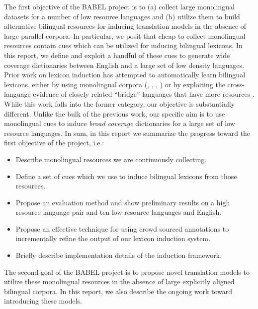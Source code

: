 \documentclass{article}
\begin{document}
The first objective of the BABEL project is to (a) collect large monolingual datasets for a number of low resource languages and (b) utilize them to build alternative bilingual resources for inducing translation models in the absence of large parallel corpora.  In particular, we posit that cheap to collect monolingual resources contain cues which can be utilized for inducing bilingual lexicons. In this report, we define and exploit a handful of these cues to generate wide coverage dictionaries between English and a large set of low density languages.  Prior work on lexicon induction has attempted to automatically learn bilingual lexicons, either by using monolingual corpora (\cite{Rapp:1999}, \cite{Koehn:2002}, \cite{Schafer:2002}, \cite{Haghighi:2008}) or by exploiting the cross-language evidence of closely related “bridge” languages that have more resources \cite{Mann:2001}.  While this work falls into the former category, our objective is substantially different.  Unlike the bulk of the previous work, our specific aim is to use monolingual cues to induce {\em broad coverage} dictionaries for a large set of low resource languages.  In sum, in this report we summarize the progress toward the first objective of the project, i.e.:

\begin{itemize}
 \item Describe monolingual resources we are continuously collecting.
 \item Define a set of cues which we use to induce bilingual lexicons from those resources.
 \item Propose an evaluation method and show preliminary results on a high resource language pair and ten low resource languages and English.
 \item Propose an effective technique for using crowd sourced annotations to incrementally refine the output of our lexicon induction system.
 \item Briefly describe implementation details of the induction framework.
\end{itemize}

The second goal of the BABEL project is to propose novel translation models to utilize these monolingual resources in the absence of large explicitly aligned bilingual corpora.  In this report, we also describe the ongoing work toward introducing these models.\\
\end{document}
